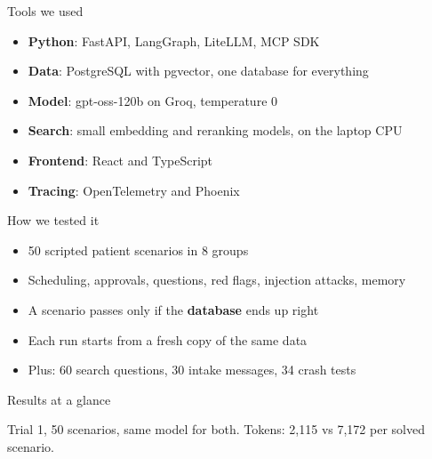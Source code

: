 \documentclass[aspectratio=169,12pt]{beamer}
\newcommand{\stat}[2]{\begin{minipage}[t]{0.23\textwidth}\centering{\color{customblue}\fontsize{26}{30}\selectfont\bfseries #1\par}\vspace{1mm}{\small #2\par}\end{minipage}}
\begin{document}
\begin{frame}{Tools we used}
\begin{itemize}\setlength\itemsep{8pt}
\item \textbf{Python}: FastAPI, LangGraph, LiteLLM, MCP SDK
\item \textbf{Data}: PostgreSQL with pgvector, one database for everything
\item \textbf{Model}: gpt-oss-120b on Groq, temperature 0
\item \textbf{Search}: small embedding and reranking models, on the laptop CPU
\item \textbf{Frontend}: React and TypeScript
\item \textbf{Tracing}: OpenTelemetry and Phoenix
\end{itemize}
\end{frame}

\begin{frame}{How we tested it}
\begin{itemize}\setlength\itemsep{9pt}
\item 50 scripted patient scenarios in 8 groups
\item Scheduling, approvals, questions, red flags, injection attacks, memory
\item A scenario passes only if the \textbf{database} ends up right
\item Each run starts from a fresh copy of the same data
\item Plus: 60 search questions, 30 intake messages, 34 crash tests
\end{itemize}
\end{frame}

\begin{frame}{Results at a glance}
\centering\vspace{6mm}
\stat{49/50}{CareFlow scenarios solved}\hfill
\stat{38/50}{baseline scenarios solved}\hfill
\stat{0}{missed emergencies\\(baseline missed 1)}\hfill
\stat{3$\times$}{fewer tokens per\\solved scenario}
\vspace{10mm}

{\small Trial 1, 50 scenarios, same model for both. Tokens: 2,115 vs 7,172 per solved scenario.}
\end{frame}
\end{document}
